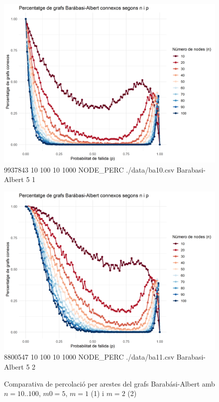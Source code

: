 \documentclass[a4paper]{article}
\begin{document}
	\begin{figure}[H]
		\centering
		\begin{minipage}{0.45\textwidth}
			\centering
			\includegraphics[width=\textwidth]{images/barabasi_10-100_5_1}
			\footnotesize{9937843 10 100 10 1000 NODE\_PERC ./data/ba10.csv Barabasi-Albert 5 1}
		\end{minipage}
		\hfill
		\begin{minipage}{0.45\textwidth}
			\centering
			\includegraphics[width=\textwidth]{images/barabasi_10-100_5_2}
			\footnotesize{8800547 10 100 10 1000 NODE\_PERC ./data/ba11.csv Barabasi-Albert 5 2}
		\end{minipage}
		\caption{Comparativa de percolació per arestes del grafs Barabási-Albert amb $n = 10..100$, $m0 = 5$, $m = 1$ (1) i $m = 2$ (2)}
		\label{fig:percolation_nodes_ba_5_x}
	\end{figure}
	
\end{document}
